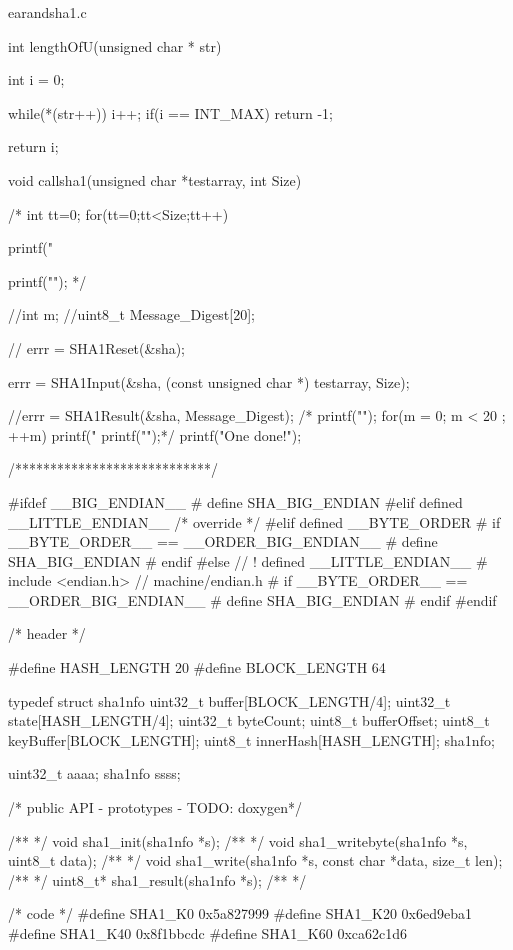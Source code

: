 \begin{chunk}{earandsha1.c}
 
int lengthOfU(unsigned char * str)
{
    int i = 0;

    while(*(str++)){
    	i++;
    	if(i == INT_MAX)
    	    return -1;
    }

    return i;
}



void callsha1(unsigned char *testarray, int Size) {
/*
int tt=0;
for(tt=0;tt<Size;tt++) {

printf("%
}  
printf("\n");
*/



  //int m;
  //uint8_t Message_Digest[20];



   // errr = SHA1Reset(&sha);


    errr = SHA1Input(&sha,
                    (const unsigned char *) testarray,
                    Size);


    //errr = SHA1Result(&sha, Message_Digest);
/*
      printf("\n");
      for(m = 0; m < 20 ; ++m) {
        printf("%
      }
      printf("\n");*/
    printf("One done!\n");
  
}



/****************************/



#ifdef __BIG_ENDIAN__
# define SHA_BIG_ENDIAN
#elif defined __LITTLE_ENDIAN__
/* override */
#elif defined __BYTE_ORDER
# if __BYTE_ORDER__ ==  __ORDER_BIG_ENDIAN__
# define SHA_BIG_ENDIAN
# endif
#else // ! defined __LITTLE_ENDIAN__
# include <endian.h> // machine/endian.h
# if __BYTE_ORDER__ ==  __ORDER_BIG_ENDIAN__
#  define SHA_BIG_ENDIAN
# endif
#endif


/* header */

#define HASH_LENGTH 20
#define BLOCK_LENGTH 64

typedef struct sha1nfo {
	uint32_t buffer[BLOCK_LENGTH/4];
	uint32_t state[HASH_LENGTH/4];
	uint32_t byteCount;
	uint8_t bufferOffset;
	uint8_t keyBuffer[BLOCK_LENGTH];
	uint8_t innerHash[HASH_LENGTH];
} sha1nfo;

uint32_t aaaa;
sha1nfo ssss;

/* public API - prototypes - TODO: doxygen*/

/**
 */
void sha1_init(sha1nfo *s);
/**
 */
void sha1_writebyte(sha1nfo *s, uint8_t data);
/**
 */
void sha1_write(sha1nfo *s, const char *data, size_t len);
/**
 */
uint8_t* sha1_result(sha1nfo *s);
/**
 */


/* code */
#define SHA1_K0  0x5a827999
#define SHA1_K20 0x6ed9eba1
#define SHA1_K40 0x8f1bbcdc
#define SHA1_K60 0xca62c1d6


\end{chunk}
